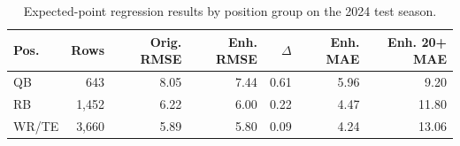 \begin{table}[!htbp]
\caption{Expected-point regression results by position group on the 2024 test season.}
\label{tab:regression-position}
\centering
\footnotesize
\begin{tabular}{lrrrrrr}
\toprule
Pos. & Rows & Orig. RMSE & Enh. RMSE & $\Delta$ & Enh. MAE & Enh. 20+ MAE \\
\midrule
QB & 643 & 8.05 & 7.44 & 0.61 & 5.96 & 9.20 \\
RB & 1,452 & 6.22 & 6.00 & 0.22 & 4.47 & 11.80 \\
WR/TE & 3,660 & 5.89 & 5.80 & 0.09 & 4.24 & 13.06 \\
\bottomrule
\end{tabular}
\end{table}
